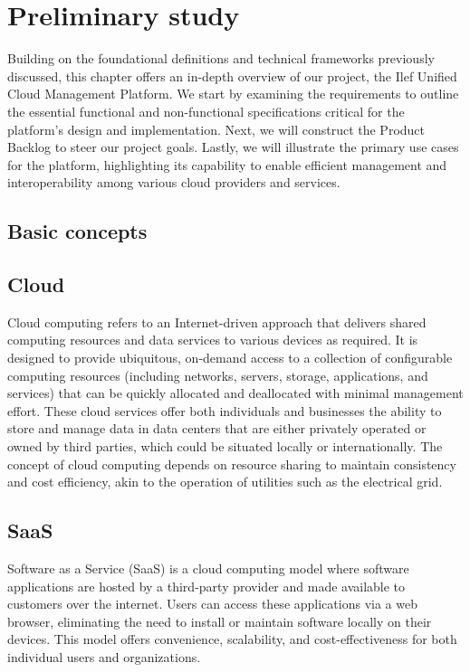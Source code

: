 \chapter{Preliminary study}

Building on the foundational definitions and technical frameworks previously discussed, this chapter offers an in-depth overview of our project, the Ilef Unified Cloud Management Platform. We start by examining the requirements to outline the essential functional and non-functional specifications critical for the platform’s design and implementation. Next, we will construct the Product Backlog to steer our project goals. Lastly, we will illustrate the primary use cases for the platform, highlighting its capability to enable efficient management and interoperability among various cloud providers and services.


\pagebreak

\section{Basic concepts}

\section{Cloud}
Cloud computing refers to an Internet-driven approach that delivers shared computing resources and data services to various devices as required. It is designed to provide ubiquitous, on-demand access to a collection of configurable computing resources (including networks, servers, storage, applications, and services) that can be quickly allocated and deallocated with minimal management effort. These cloud services offer both individuals and businesses the ability to store and manage data in data centers that are either privately operated or owned by third parties, which could be situated locally or internationally. The concept of cloud computing depends on resource sharing to maintain consistency and cost efficiency, akin to the operation of utilities such as the electrical grid.


\section{SaaS}
Software as a Service (SaaS) is a cloud computing model where software applications are hosted by a third-party provider and made available to customers over the internet. Users can access these applications via a web browser, eliminating the need to install or maintain software locally on their devices. This model offers convenience, scalability, and cost-effectiveness for both individual users and organizations.

